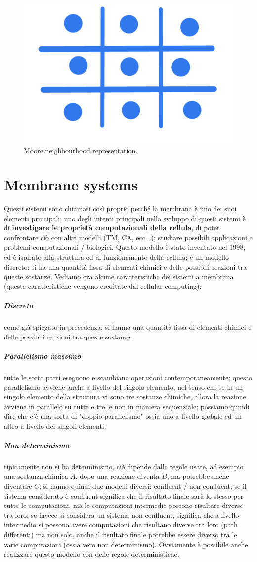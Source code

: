 \documentclass[12pt,a4paper]{report}
\begin{document}
\begin{figure}[h]
	\centering
	\includegraphics[width=0.3\linewidth]{img/M - neighbourhood}
	\caption{Moore neighbourhood representation.}
	\label{M - neighbourhood}
\end{figure}

\section{Membrane systems}
\label{membrane systems}
Questi sistemi sono chiamati così proprio perché la membrana è uno dei suoi elementi principali; uno degli intenti principali nello sviluppo di questi sistemi è di \textbf{investigare le proprietà computazionali della cellula}, di poter confrontare ciò con altri modelli (TM, CA, ecc...); studiare possibili applicazioni a problemi computazionali / biologici. Questo modello è stato inventato nel 1998, ed è ispirato alla struttura ed al funzionamento della cellula; è un modello discreto: si ha una quantità fissa di elementi chimici e delle possibili reazioni tra queste sostanze. Vediamo ora alcune caratteristiche dei sistemi a membrana (queste caratteristiche vengono ereditate dal cellular computing):

\subparagraph{Discreto}
come già spiegato in precedenza, si hanno una quantità fissa di elementi chimici e delle possibili reazioni tra queste sostanze.

\subparagraph{Parallelismo massimo}
tutte le sotto parti eseguono e scambiano operazioni contemporaneamente; questo parallelismo avviene anche a livello del singolo elemento, nel senso che se in un singolo elemento della struttura vi sono tre sostanze chimiche, allora la reazione avviene in parallelo su tutte e tre, e non in maniera sequenziale; possiamo quindi dire che c'è una sorta di "doppio parallelismo" ossia uno a livello globale ed un altro a livello dei singoli elementi.

\subparagraph{Non determinismo}
tipicamente non si ha determinismo, ciò dipende dalle regole usate, ad esempio una sostanza chimica $A$, dopo una reazione diventa $B$, ma potrebbe anche diventare $C$; si hanno quindi due modelli diversi: confluent / non-confluent; se il sistema considerato è confluent significa che il risultato finale sarà lo stesso per tutte le computazioni, ma le computazioni intermedie possono risultare diverse tra loro; se invece si considera un sistema non-confluent, significa che a livello intermedio si possono avere computazioni che risultano diverse tra loro (path differenti) ma non solo, anche il risultato finale potrebbe essere diverso tra le varie computazioni (ossia vero non determinismo). Ovviamente è possibile anche realizzare questo modello con delle regole deterministiche.
\end{document}
